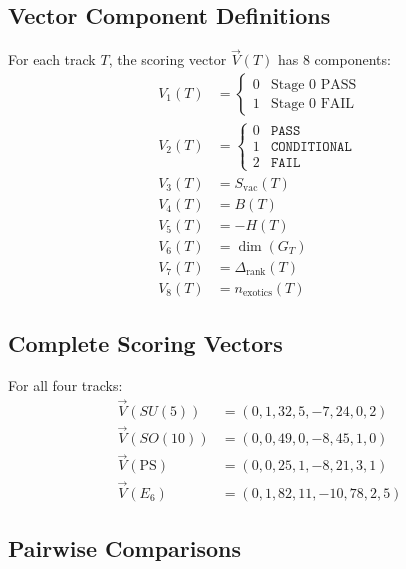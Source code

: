 \documentclass[11pt,a4paper]{article}
\begin{document}
\subsection{Vector Component Definitions}
\label{app:vector-components}

For each track $T$, the scoring vector $\vec{V}(T)$ has 8 components:
\begin{align}
\label{eq:sv-comp-1}
V_1(T) &= \begin{cases} 0 & \text{Stage 0 PASS} \\ 1 & \text{Stage 0 FAIL} \end{cases} \\
\label{eq:sv-comp-2}
V_2(T) &= \begin{cases} 0 & \texttt{PASS} \\ 1 & \texttt{CONDITIONAL} \\ 2 & \texttt{FAIL} \end{cases} \\
\label{eq:sv-comp-3}
V_3(T) &= S_{\text{vac}}(T) \\
\label{eq:sv-comp-4}
V_4(T) &= B(T) \\
\label{eq:sv-comp-5}
V_5(T) &= -H(T) \\
\label{eq:sv-comp-6}
V_6(T) &= \dim(G_T) \\
\label{eq:sv-comp-7}
V_7(T) &= \Delta_{\text{rank}}(T) \\
\label{eq:sv-comp-8}
V_8(T) &= n_{\text{exotics}}(T)
\end{align}

\subsection{Complete Scoring Vectors}
\label{app:complete-vectors}

For all four tracks:
\begin{align}
\label{eq:sv-su5-full}
\vec{V}(SU(5)) &= (0, 1, 32, 5, -7, 24, 0, 2) \\
\label{eq:sv-so10-full}
\vec{V}(SO(10)) &= (0, 0, 49, 0, -8, 45, 1, 0) \\
\label{eq:sv-ps-full}
\vec{V}(\text{PS}) &= (0, 0, 25, 1, -8, 21, 3, 1) \\
\label{eq:sv-e6-full}
\vec{V}(E_6) &= (0, 1, 82, 11, -10, 78, 2, 5)
\end{align}

\subsection{Pairwise Comparisons}
\label{app:pairwise}
\end{document}
